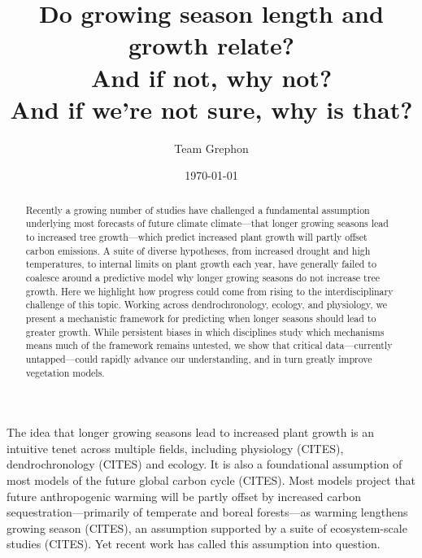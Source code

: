 \documentclass[11pt]{article}
\begin{document}
\renewcommand{\refname}{\CHead{}}


\title{Do growing season length and growth relate? \\ And if not, why not? \\ And if we're not sure, why is that?}
\author{Team Grephon}
\date{\today}
\maketitle

\begin{abstract}
Recently a growing number of studies have challenged a fundamental assumption underlying most forecasts of future climate climate---that longer growing seasons lead to increased tree growth---which predict increased plant growth will partly offset carbon emissions. A suite of diverse hypotheses, from increased drought and high temperatures, to internal limits on plant growth each year, have generally failed to coalesce around a predictive model why longer growing seasons do not increase tree growth. Here we highlight how progress could come from rising to the interdisciplinary challenge of this topic. Working across dendrochronology, ecology, and physiology, we present a mechanistic framework for predicting when longer seasons should lead to greater growth. While persistent biases in which disciplines study which mechanisms means much of the framework remains untested, we show that critical data---currently untapped---could rapidly advance our understanding, and in turn greatly improve vegetation models. %
\end{abstract}

The idea that longer growing seasons lead to increased plant growth is an intuitive tenet across multiple fields, including physiology (CITES), dendrochronology (CITES) and ecology. It is also a foundational assumption of most models of the future global carbon cycle (CITES). Most models project that future anthropogenic warming will be partly offset by increased carbon sequestration---primarily of temperate and boreal forests---as warming lengthens growing season (CITES), an assumption supported by a suite of ecosystem-scale studies (CITES). Yet recent work has called this assumption into question.
\end{document}
